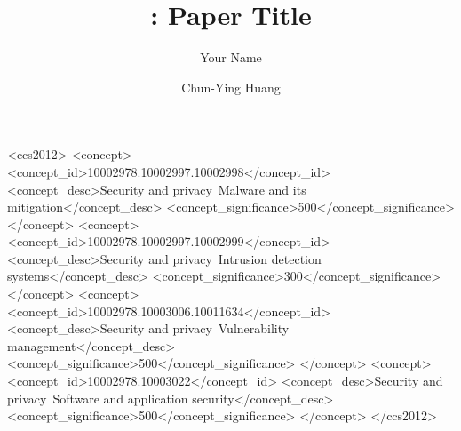 \documentclass[sigconf]{acmart}
\begin{document}
\title{\sys: Paper Title}

\iffalse
\author{Anonymous Authors}
\authornotemark[1]
\email{anonymous@institution.com}
\affiliation{%
  \institution{Anonymous Institution}
  \city{Anonymous City}
  \country{Anonymous Country}
}
\fi

\author{Your Name}
\authornotemark[1]

\author{Chun-Ying Huang}
\authornotemark[1]

\begin{CCSXML}
<ccs2012>
<concept>
<concept_id>10002978.10002997.10002998</concept_id>
<concept_desc>Security and privacy~Malware and its mitigation</concept_desc>
<concept_significance>500</concept_significance>
</concept>
<concept>
<concept_id>10002978.10002997.10002999</concept_id>
<concept_desc>Security and privacy~Intrusion detection systems</concept_desc>
<concept_significance>300</concept_significance>
</concept>
<concept>
<concept_id>10002978.10003006.10011634</concept_id>
<concept_desc>Security and privacy~Vulnerability management</concept_desc>
<concept_significance>500</concept_significance>
</concept>
<concept>
<concept_id>10002978.10003022</concept_id>
<concept_desc>Security and privacy~Software and application security</concept_desc>
<concept_significance>500</concept_significance>
</concept>
</ccs2012>
\end{CCSXML}


\begin{abstract}

\end{abstract}


\maketitle





\end{document}
